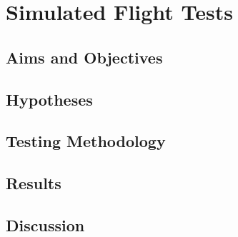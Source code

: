 \chapter{Simulated Flight Tests}

	\section{Aims and Objectives}

	\section{Hypotheses}

	\section{Testing Methodology}

	\section{Results}

	\section{Discussion}
